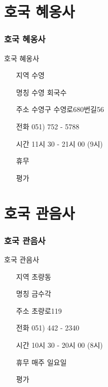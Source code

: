 \documentclass[aspectratio=1610,17pt,xcolor=pdftex,dvipsnames,table,handout]{beamer}
\begin{document}
		\section{ 호국 혜옹사 }
		\begin{frame} [t,plain]
		\frametitle{ 호국 혜옹사 }
			\begin{block} {호국 혜옹사}
			\setlength{\leftmargini}{4em}			
			\begin{itemize}
				\item [지역] 수영 
				\item [명칭] 수영 회국수
				\item [주소] 수영구 수영로680번길56
				\item [전화] 051) 752 - 5788
				\item [시간] 11시 30 - 21시 00 (9시)
				\item [휴무] 
				\item [평가] 
			\end{itemize}
			\end{block}						
		\end{frame}						


		\section{ 호국 관음사 }
		\begin{frame} [t,plain]
		\frametitle{ 호국 관음사 }
			\begin{block} { 호국 관음사 }
			\setlength{\leftmargini}{4em}			
			\begin{itemize}
				\item [지역] 초량동
				\item [명칭] 금수각
				\item [주소] 초량로119
				\item [전화] 051) 442 - 2340
				\item [시간] 10시 30 - 20시 00 (8시)
				\item [휴무] 매주 일요일
				\item [평가] 
			\end{itemize}
			\end{block}						
		\end{frame}						


\end{document}
